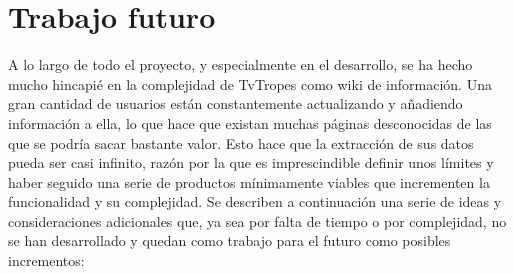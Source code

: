 \section{Trabajo futuro}
A lo largo de todo el proyecto, y especialmente en el desarrollo, se ha hecho
mucho hincapié en la complejidad de TvTropes como wiki de información. Una gran
cantidad de usuarios están constantemente actualizando y añadiendo información a
ella, lo que hace que existan muchas páginas desconocidas de las que se podría
sacar bastante valor. Esto hace que la extracción de sus datos pueda ser casi
infinito, razón por la que es imprescindible definir unos límites y haber
seguido una serie de productos mínimamente viables que incrementen la
funcionalidad y su complejidad. Se describen a continuación una serie de ideas y
consideraciones adicionales que, ya sea por falta de tiempo o por complejidad,
no se han desarrollado y quedan como trabajo para el futuro como posibles
incrementos:

